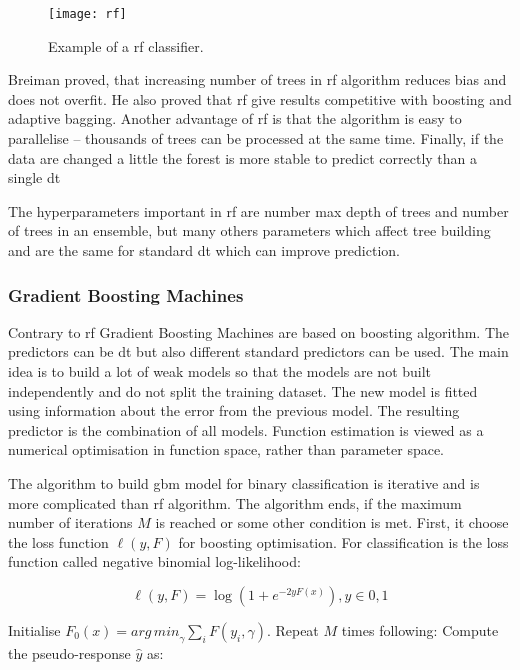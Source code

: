 \documentclass[thesis=M,english]{FITthesis}[2012/10/20]
\begin{document}
\begin{figure}[ht]\centering
    \texttt{[image: rf]}
    \caption{Example of a \gls{rf} classifier.}\label{fig:rf}
\end{figure}

Breiman proved, that increasing number of trees in \gls{rf} algorithm reduces bias and does not overfit\cite{Breiman2001rf}. He also proved that \gls{rf} give results competitive with boosting and adaptive bagging. Another advantage of \gls{rf} is that the algorithm is easy to parallelise -- thousands of trees can be processed at the same time. Finally, if the data are changed a little the forest is more stable to predict correctly than a single \gls{dt}

The hyperparameters important in \gls{rf} are number max depth of trees and number of trees in an ensemble, but many others parameters which affect tree building and are the same for standard \gls{dt} which can improve prediction. 

\subsubsection{Gradient Boosting Machines}

Contrary to \gls{rf} Gradient Boosting Machines are based on boosting algorithm. The predictors can be \gls{dt} but also different standard predictors can be used. The main idea is to build a lot of weak models so that the models are not built independently and do not split the training dataset. The new model is fitted using information about the error from the previous model. The resulting predictor is the combination of all models. Function estimation is viewed as a numerical optimisation in function space, rather than parameter space. \cite{Friedman2000gbm}

The algorithm to build \gls{gbm} model for binary classification is iterative and is more complicated than \gls{rf} algorithm. The algorithm ends, if the maximum number of iterations $M$ is reached or some other condition is met.  First, it choose the loss function $\ell(y, F)$ for boosting optimisation. For classification is the loss function called negative binomial log-likelihood:

\begin{equation}
\ell(y, F) = \log{(1+e^{-2yF(x)})}, y \in {0,1}
\end{equation}

\noindent Initialise $F_0(x) = {arg\,min}_{\gamma} \sum_{i}F(y_i,\gamma) $. Repeat $M$ times following: Compute the pseudo-response $\hat{y}$ as:
\end{document}
